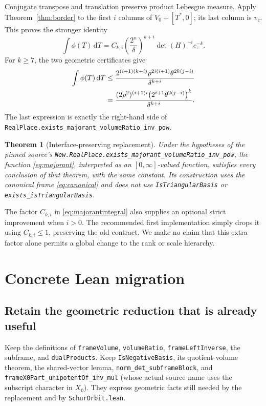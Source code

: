 \documentclass[11pt,letterpaper]{article}
\newtheorem{theorem}{Theorem}[section]
\theoremstyle{remark}
\newcommand{\dd}{\,\mathrm d}
\newcommand{\code}[1]{{\small\urlstyle{tt}\nolinkurl{#1}}}
\begin{document}
Conjugate transpose and translation preserve product Lebesgue measure. Apply
Theorem~\ref{thm:border} to the first $i$ columns of $V_0+[T^*,0]$; its last
column is $v_z$. This proves the stronger identity
\begin{equation}\label{eq:majorantintegral}
 \int\phi(T)\dd T
 =C_{k,i}\left(\frac{2^n}{\delta}\right)^{k+i}
 \det(H)^{-i}c_z^{-k}.
\end{equation}
For $k\geq7$, the two geometric certificates give
\begin{align}
 \int\phi(T)\dd T
 &\leq\frac{2^{(i+1)(k+i)}\rho^{2i(i+1)}\theta^{2k(j-i)}}
 {\delta^{k+i}}\notag\\
 &=\frac{(2\rho^2)^{(i+1)i}
 \bigl(2^{i+1}\theta^{2(j-i)}\bigr)^k}{\delta^{k+i}}.\label{eq:published}
\end{align}
The last expression is exactly the right-hand side of
\code{RealPlace.exists_majorant_volumeRatio_inv_pow}.

\begin{theorem}[Interface-preserving replacement]
Under the hypotheses of the pinned source's
\code{New.RealPlace.exists_majorant_volumeRatio_inv_pow}, the function
\eqref{eq:majorant}, interpreted as an $[0,\infty]$-valued function, satisfies
every conclusion of that theorem, with the same constant. Its construction uses
the canonical frame \eqref{eq:canonical} and does not use
\code{IsTriangularBasis} or \code{exists_isTriangularBasis}.
\end{theorem}

The factor $C_{k,i}$ in \eqref{eq:majorantintegral} also supplies an optional
strict improvement when $i>0$. The recommended first implementation simply
drops it using $C_{k,i}\leq1$, preserving the old contract. We make no claim
that this extra factor alone permits a global change to the rank or scale
hierarchy.

\section{Concrete Lean migration}

\subsection{Retain the geometric reduction that is already useful}

Keep the definitions of \code{frameVolume}, \code{volumeRatio},
\code{frameLeftInverse}, the subframe, and \code{dualProducts}. Keep
\code{IsNegativeBasis}, its quotient-volume theorem, the shared-vector lemma,
\code{norm_det_subframeBlock}, and
\code{frameX0Part_unipotentOf_inv_mul} (whose actual source name uses the
subscript character in $X_0$). They express geometric facts still needed by the
replacement and by \code{SchurOrbit.lean}.
\end{document}

